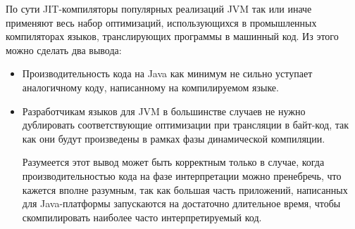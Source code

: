 По сути JIT-компиляторы популярных реализаций JVM так или иначе применяют весь набор оптимизаций,
использующихся в промышленных компиляторах языков, транслирующих программы в машинный код.
Из этого можно сделать два вывода:
\begin{itemize}
    \item Производительность кода на Java как минимум не сильно уступает аналогичному коду,
    написанному на компилируемом языке.
    \item Разработчикам языков для JVM в большинстве случаев не нужно дублировать соответствующие
    оптимизации при трансляции в байт-код, так как они будут произведены в рамках фазы
    динамической компиляции.

    Разумеется этот вывод может быть корректным только в случае, когда производительностью кода
    на фазе интерпретации можно пренебречь, что кажется вполне разумным, так как большая часть
    приложений, написанных для Java-платформы запускаются на достаточно длительное время,
    чтобы скомпилировать наиболее часто интерпретируемый код.
\end{itemize}
